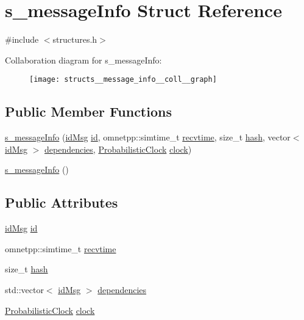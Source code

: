 \hypertarget{structs__message_info}{}\section{s\+\_\+message\+Info Struct Reference}
\label{structs__message_info}


{\ttfamily \#include $<$structures.\+h$>$}



Collaboration diagram for s\+\_\+message\+Info\+:\nopagebreak
\begin{figure}[H]
\begin{center}
\leavevmode
\texttt{[image: structs\_\_message\_info\_\_coll\_\_graph]}
\end{center}
\end{figure}
\subsection*{Public Member Functions}
\begin{DoxyCompactItemize}
\item 
\hyperlink{structs__message_info_aa626a79c3b41f14b406f8d86b87fcfb9}{s\+\_\+message\+Info} (\hyperlink{structures_8h_a83a1d9a070efa5341da84cfd8e28d3e5}{id\+Msg} \hyperlink{structs__message_info_a6c2928774199848fd25b4e8ffb7870c2}{id}, omnetpp\+::simtime\+\_\+t \hyperlink{structs__message_info_a3600b24205dc07ce06774af44976c107}{recvtime}, size\+\_\+t \hyperlink{structs__message_info_a9b627c36e814fbbd04a89bc6e827e4ff}{hash}, vector$<$ \hyperlink{structures_8h_a83a1d9a070efa5341da84cfd8e28d3e5}{id\+Msg} $>$ \hyperlink{structs__message_info_a82f52cb53fb0e9b1b985f173f3a013be}{dependencies}, \hyperlink{class_probabilistic_clock}{Probabilistic\+Clock} \hyperlink{structs__message_info_ad35ea02bbca3d54d5b150bb6ea476888}{clock})
\item 
\hyperlink{structs__message_info_a4cde6289906418221236646ae3df77c8}{s\+\_\+message\+Info} ()
\end{DoxyCompactItemize}
\subsection*{Public Attributes}
\begin{DoxyCompactItemize}
\item 
\hyperlink{structures_8h_a83a1d9a070efa5341da84cfd8e28d3e5}{id\+Msg} \hyperlink{structs__message_info_a6c2928774199848fd25b4e8ffb7870c2}{id}
\item 
omnetpp\+::simtime\+\_\+t \hyperlink{structs__message_info_a3600b24205dc07ce06774af44976c107}{recvtime}
\item 
size\+\_\+t \hyperlink{structs__message_info_a9b627c36e814fbbd04a89bc6e827e4ff}{hash}
\item 
std\+::vector$<$ \hyperlink{structures_8h_a83a1d9a070efa5341da84cfd8e28d3e5}{id\+Msg} $>$ \hyperlink{structs__message_info_a82f52cb53fb0e9b1b985f173f3a013be}{dependencies}
\item 
\hyperlink{class_probabilistic_clock}{Probabilistic\+Clock} \hyperlink{structs__message_info_ad35ea02bbca3d54d5b150bb6ea476888}{clock}
\end{DoxyCompactItemize}


